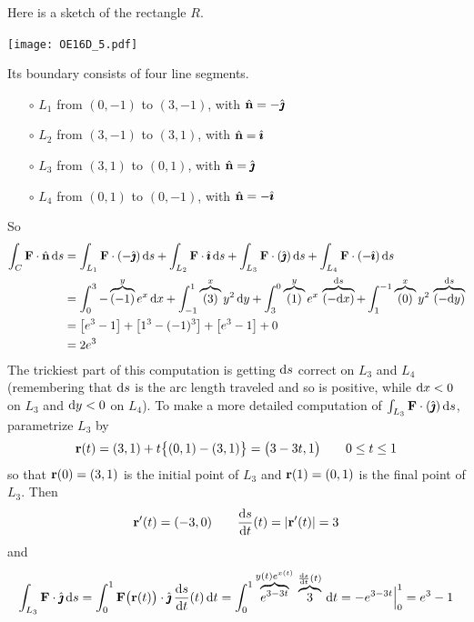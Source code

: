 \begin{solution} 
Here is a sketch of the rectangle $R$.

\begin{center}
     \texttt{[image: OE16D\_5.pdf]}\
\end{center}

Its boundary consists of four line segments.
\begin{itemize}\itemsep1pt \parskip0pt  %
\item[$\circ$]
$L_1$ from $(0,-1)$ to $(3,-1)$, with $\hat{\mathbf{n}} = -\hat{\pmb{\jmath}}$
\item[$\circ$]
$L_2$ from $(3,-1)$ to $(3,1)$, with $\hat{\mathbf{n}} = \hat{\pmb{\imath}}$
\item[$\circ$]
$L_3$ from $(3,1)$ to $(0,1)$, with $\hat{\mathbf{n}} = \hat{\pmb{\jmath}}$
\item[$\circ$]
$L_4$ from $(0,1)$ to $(0,-1)$, with $\hat{\mathbf{n}} = -\hat{\pmb{\imath}}$
\end{itemize}
So
\begin{align*}
\int_C \mathbf{F}\cdot\hat{\mathbf{n}}\,\mathrm{d}s
&= \int_{L_1} \mathbf{F}\cdot(-\hat{\pmb{\jmath}})\,\mathrm{d}s
   +\int_{L_2} \mathbf{F}\cdot \hat{\pmb{\imath}}\,\mathrm{d}s
   +\int_{L_3} \mathbf{F}\cdot(\hat{\pmb{\jmath}})\,\mathrm{d}s
   +\int_{L_4} \mathbf{F}\cdot(-\hat{\pmb{\imath}})\,\mathrm{d}s \\
&= \int_0^3  -\overbrace{(-1)}^{y}e^x\,\mathrm{d}x
   +\int_{-1}^1  \overbrace{(3)}^{x}y^2\,\mathrm{d}y
   +\int^0_3  \overbrace{(1)}^{y}e^x\,\overbrace{(-\mathrm{d}x)}^{\mathrm{d}s}
   +\int^{-1}_1  \overbrace{(0)}^{x}y^2\,\overbrace{(-\mathrm{d}y)}^{\mathrm{d}s} \\
&=\big[e^3-1\big]+\big[1^3-(-1)^3\big] + \big[e^3-1\big]+0 \\
&=2e^3
\end{align*}
The trickiest part of this computation is getting $\mathrm{d}s$ correct on
$L_3$ and $L_4$ (remembering that $\mathrm{d}s$ is the arc length traveled
and so is positive, while $\mathrm{d}x<0$ on $L_3$ and $\mathrm{d}y<0$ on $L_4$).
To make a more detailed computation of $\int_{L_3} \mathbf{F}\cdot(\hat{\pmb{\jmath}})\,\mathrm{d}s$,
parametrize $L_3$ by
\begin{equation*}
\mathbf{r}(t) = (3,1) + t\big\{(0,1)-(3,1)\big\}
       = \big(3-3t,1\big)\qquad
0\le t\le 1
\end{equation*}
so that $\mathbf{r}(0) = (3,1)$ is the initial point of $L_3$ and
$\mathbf{r}(1) = (0,1)$ is the final point of $L_3$. Then
\begin{equation*}
\vr'(t) = (-3,0)\qquad
\diff{s}{t}(t) = |\vr'(t)| = 3
\end{equation*}
and
\begin{align*}
\int_{L_3} \vF\cdot \hj\,\dee{s}
=\int_0^1 \vF\big(\vr(t)\big)\cdot \hj\,\diff{s}{t}(t)\,\dee{t}
=\int_0^1\overbrace{e^{3-3t}}^{y(t)e^{x(t)}}\,
\overbrace{3}^{\diff{s}{t}(t)}\,\dee{t}
=-e^{3-3t}\Big|_0^1
=e^3-1
\end{align*}
\end{solution}


